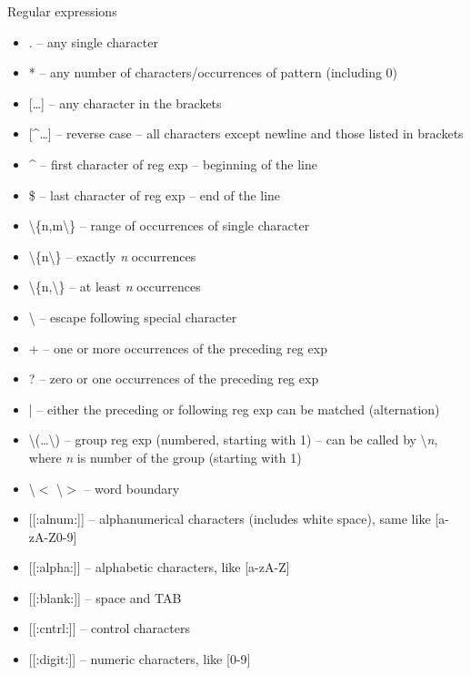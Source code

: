 \documentclass[compress, ucs, xelatex, 11pt, xcolor=svgnames,
  hyperref={
    bookmarks=true,
    unicode=true,
    colorlinks=true,
    pdftitle={Linux, command line and MetaCentrum},
    plainpages=false,
    pdfauthor={Vojtech Zeisek},
    pdfsubject={Course about use of Linux command line, writing shell scripts and using MetaCentrum of CESNET},
    pdfcreator={XeLaTeX},
    pdfkeywords={Linux, GNU, BASH, shell, command line, MetaCentrum},
    linkcolor=Red,
    anchorcolor=Blue,
    citecolor=Purple,
    filecolor=DodgerBlue,
    menucolor=DarkOrchid,
    urlcolor=DeepSkyBlue,
    pdftex},
  url={hyphens, lowtilde} %
  ]{beamer}
\begin{document}
\begin{frame}[allowframebreaks]{Regular expressions}
\label{regexp}
\begin{itemize}
  \item \alert{.} -- any single character
  \item \alert{*} -- any number of characters/occurrences of pattern (including 0)
  \item \alert{[\ldots]} -- any character in the brackets
  \item \alert{[\textasciicircum\ldots]} -- reverse case -- all characters except newline and those listed in brackets
  \item \alert{\textasciicircum} -- first character of reg exp -- beginning of the line
  \item \alert{\$} -- last character of reg exp -- end of the line
  \item \alert{\textbackslash\{n,m\textbackslash\}} -- range of occurrences of single character
  \item \alert{\textbackslash\{n\textbackslash\}} -- exactly \textit{n} occurrences
  \item \alert{\textbackslash\{n,\textbackslash\}} -- at least \textit{n} occurrences
  \item \alert{\textbackslash} -- escape following special character
  \item \alert{+} -- one or more occurrences of the preceding reg exp
  \item \alert{?} -- zero or one occurrences of the preceding reg exp
  \item \alert{|} -- either the preceding or following reg exp can be matched (alternation)
  \item \alert{\textbackslash(\ldots\textbackslash)} -- group reg exp (numbered, starting with 1) -- can be called by \alert{\textbackslash\textit{n}}, where \textit{n} is number of the group (starting with 1)
  \item \alert{\textbackslash$<$ \textbackslash$>$} -- word boundary
  \item \alert{[[:alnum:]]} -- alphanumerical characters (includes white space), same like \alert{[a-zA-Z0-9]}
  \item \alert{[[:alpha:]]} -- alphabetic characters, like \alert{[a-zA-Z]}
  \item \alert{[[:blank:]]} -- space and TAB
  \item \alert{[[:cntrl:]]} -- control characters
  \item \alert{[[:digit:]]} -- numeric characters, like \alert{[0-9]}

\end{itemize}
\end{frame}
\end{document}
